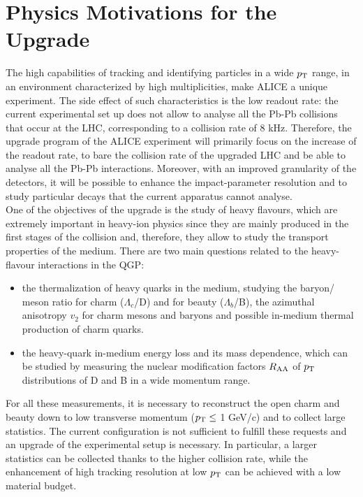 \section{Physics Motivations for the Upgrade}
The high capabilities of tracking and identifying particles in a wide $p_\text{T}$ range, in an environment characterized by high multiplicities, make ALICE a unique experiment. The side effect of such characteristics is the low readout rate: the current experimental set up does not allow to analyse all the Pb-Pb collisions that occur at the LHC, corresponding to a collision rate of 8 kHz. Therefore, the upgrade program of the ALICE experiment will primarily focus on the increase of the readout rate, to bare the collision rate of the upgraded LHC and be able to analyse all the Pb-Pb interactions. Moreover, with an improved granularity of the detectors, it will be possible to enhance the impact-parameter resolution and to study particular decays that the current apparatus cannot analyse.\\
One of the objectives of the upgrade is the study of heavy flavours, which are extremely important in heavy-ion physics since they are mainly produced in the first stages of the collision and, therefore, they allow to study the transport properties of the medium. There are two main questions related to the heavy-flavour interactions in the QGP:
\begin{itemize}
 \item the thermalization of heavy quarks in the medium, studying the baryon/ meson ratio for charm ($\Lambda_{c}$/D) and for beauty ($\Lambda_{b}$/B), the azimuthal anisotropy $v_2$ for charm mesons and baryons and possible in-medium thermal production of charm quarks.
 \item the heavy-quark in-medium energy loss and its mass dependence, which can be studied by measuring the nuclear modification factors $R_{\mathrm{AA}}$ of $p_\text{T}$ distributions of D and B in a wide momentum range.
\end{itemize}
For all these measurements, it is necessary to reconstruct the open charm and beauty down to low transverse momentum ($p_\text{T} \leq$ 1 GeV/c) and to collect large statistics. The current configuration is not sufficient to fulfill these requests and an upgrade of the experimental setup is necessary. In particular, a larger statistics can be collected thanks to the higher collision rate, while the enhancement of high tracking resolution at low $p_\text{T}$ can be achieved with a low material budget.\\
